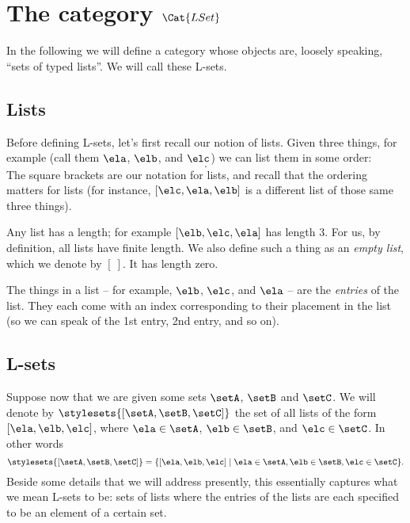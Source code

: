 
\section{The category $\Cat{LSet}$}

In the following we will define a category whose objects are, loosely speaking, ``sets of typed lists''. We will call these L-sets. 

\subsection{Lists}

Before defining L-sets, let's first recall our notion of lists. Given three things, for example (call them $\ela$, $\elb$, and $\elc$) we can list them in some order: 
\begin{equation}
[\elb, \elc, \ela].
\end{equation}
The square brackets are our notation for lists, and recall that the ordering matters for lists (for instance, $[\elc, \ela, \elb]$ is a different list of those same three things). 

Any list has a length; for example $[\elb, \elc, \ela]$ has length 3. For us, by definition, all lists have finite length. We also define such a thing as an \emph{empty list}, which we denote by $[ \ ]$. It has length zero. 

The things in a list -- for example, $\elb$, $\elc$, and $\ela$ -- are the \emph{entries} of the list. They each come with an index corresponding to their placement in the list (so we can speak of the 1st entry, 2nd entry, and so on).  


\subsection{L-sets}

Suppose now that we are given some sets $\setA$, $\setB$ and $\setC$.  We will denote by $\stylesets{[\setA, \setB, \setC]}$ the set of all lists of the form $[\ela, \elb, \elc]$, where $\ela \in \setA$, $\elb \in \setB$, and $\elc \in \setC$. In other words
\begin{equation}
\stylesets{[\setA, \setB, \setC]} = \{ [\ela, \elb, \elc] \mid \ela \in \setA, \elb \in \setB, \elc \in \setC \}.
\end{equation}
Beside some details that we will address presently, this essentially captures what we mean L-sets to be: sets of lists where the entries of the lists are each specified to be an element of a certain set. 

